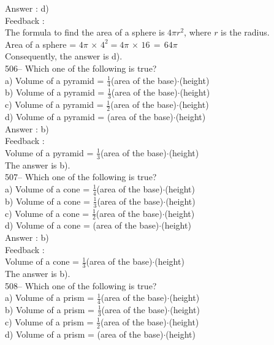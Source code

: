 ﻿\documentclass[letterpaper, 12pt]{article}
\begin{document}
Answer : d)\\

Feedback : \\
The formula to find the area of a sphere is $4\pi r^{2}$, where $r$ is the radius.  \\
Area of a sphere = $4\pi\,\times\,4^{2}=4\pi\,\times\,16\,=\,64\pi$\\
Consequently, the answer is d).\\

506-- Which one of the following is true?\\
a) Volume of a pyramid = $\frac{1}{4}$(area of the
base)$\cdot$(height)\\[2mm]
b) Volume of a pyramid = $\frac{1}{3}$(area of the
base)$\cdot$(height)\\[2mm]
c) Volume of a pyramid = $\frac{1}{2}$(area of the
base)$\cdot$(height)\\[2mm]
d) Volume of a pyramid = (area of the base)$\cdot$(height)\\

Answer : b)\\

Feedback :  \\
Volume of a pyramid = $\frac{1}{3}$(area of the base)$\cdot$(height)\\
The answer is b).\\

507-- Which one of the following is true?\\
a) Volume of a cone = $\frac{1}{4}$(area of the
base)$\cdot$(height)\\[2mm]
b) Volume of a cone = $\frac{1}{3}$(area of the
base)$\cdot$(height)\\[2mm]
c) Volume of a cone = $\frac{1}{2}$(area of the
base)$\cdot$(height)\\[2mm]
d) Volume of a cone = (area of the base)$\cdot$(height)\\

Answer : b)\\

Feedback :  \\
Volume of a cone = $\frac{1}{3}$(area of the base)$\cdot$(height)\\
The answer is b).\\

508-- Which one of the following is true?\\
a) Volume of a prism = $\frac{1}{4}$(area of the
base)$\cdot$(height)\\[2mm]
b) Volume of a prism = $\frac{1}{3}$(area of the
base)$\cdot$(height)\\[2mm]
c) Volume of a prism = $\frac{1}{2}$(area of the
base)$\cdot$(height)\\[2mm]
d) Volume of a prism = (area of the base)$\cdot$(height)\\
\end{document}
